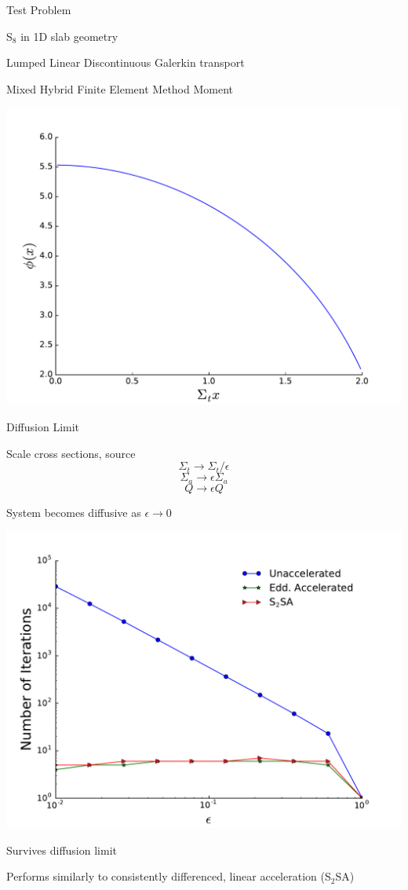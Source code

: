 \documentclass[10pt]{beamer}
\begin{document}

\begin{frame}{Test Problem}

	S$_8$ in 1D slab geometry 

	\pause
	Lumped Linear Discontinuous Galerkin transport 

	\pause
	Mixed Hybrid Finite Element Method Moment 

	\pause 
	\centerline{\includegraphics[width=.5\paperwidth]{figs/exSol.pdf}}

\end{frame}

\begin{frame}{Diffusion Limit}

	\footnotesize
	Scale cross sections, source 
	$$\Sigma_t \rightarrow \Sigma_t/\epsilon $$
	$$\Sigma_a \rightarrow \epsilon \Sigma_a$$
	$$Q \rightarrow \epsilon Q$$ 

	System becomes diffusive as $\epsilon \rightarrow 0$ 

	\pause
	\centerline{\includegraphics[width=.5\paperwidth]{figs/diffLimit.pdf}}

	\pause
	Survives diffusion limit 

	\pause
	Performs similarly to consistently differenced, linear acceleration (S$_2$SA)

\end{frame}
\end{document}
